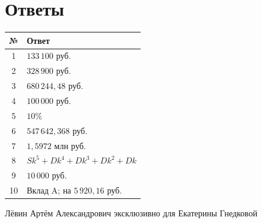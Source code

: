 \documentclass[a4paper,12pt]{article}
\begin{document}
\section*{Ответы}

\begin{center}
\renewcommand{\arraystretch}{1.4}
\begin{tabularx}{\linewidth}{@{}c X@{}}
\toprule
№ & Ответ \\
\midrule
1 & $133\,100$ руб. \\
2 & $328\,900$ руб. \\
3 & $680\,244{,}48$ руб. \\
4 & $100\,000$ руб. \\
5 & $10\%$ \\
6 & $547\,642{,}368$ руб. \\
7 & $1{,}5972$ млн руб. \\
8 & $Sk^5+Dk^4+Dk^3+Dk^2+Dk$ \\
9 & $10\,000$ руб. \\
10 & Вклад A; на $5\,920{,}16$ руб. \\
\bottomrule
\end{tabularx}
\end{center}

\vfill
{\small\textcolor{darkaccent}{Лёвин Артём Александрович эксклюзивно для Екатерины Гнедковой}}
\end{document}
